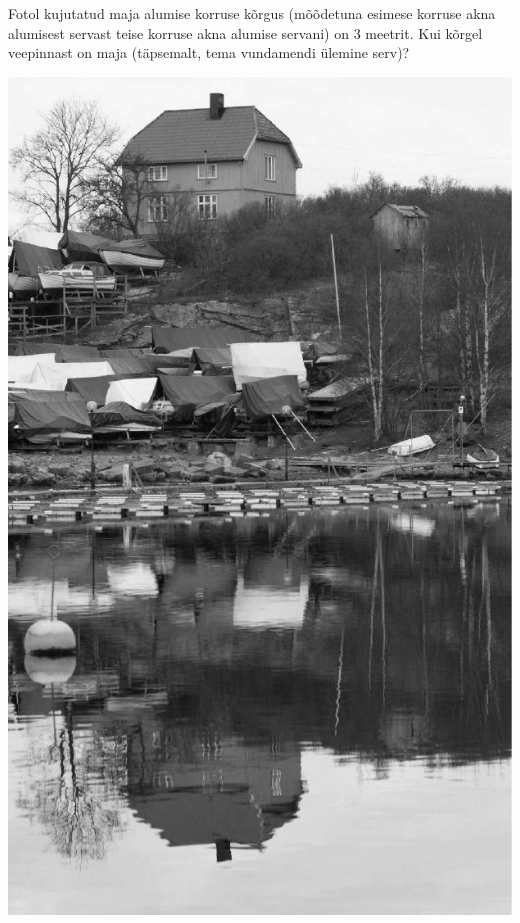 \documentclass[10pt]{article}
\begin{document}
{%

Fotol kujutatud maja alumise korruse kõrgus (mõõdetuna esimese korruse akna alumisest servast teise korruse akna alumise servani) on 3 meetrit. Kui kõrgel veepinnast on maja (täpsemalt, tema vundamendi ülemine serv)?

\begin{center}
	\includegraphics[height=\textheight]{2008-v3g-04-yl}
\end{center}
\probend
\bigskip

}
\end{document}
